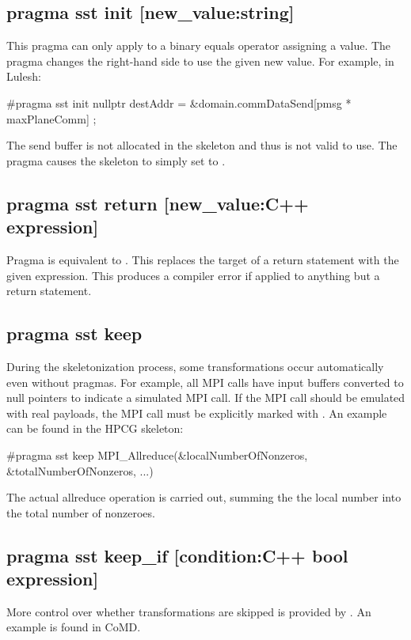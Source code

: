 \subsection{pragma sst init [new\_value:string]}
This pragma can only apply to a binary equals operator assigning a value.
The pragma changes the right-hand side to use the given new value.
For example, in Lulesh:

\begin{CppCode}
#pragma sst init nullptr
  destAddr = &domain.commDataSend[pmsg * maxPlaneComm] ;
\end{CppCode}
The send buffer  is not allocated in the skeleton and thus is not valid to use.
The pragma causes the skeleton to simply set  to .

\subsection{pragma sst return [new\_value:C++ expression]}
Pragma is equivalent to . This replaces the target of a return statement with the given expression.
This produces a compiler error if applied to anything but a return statement.

\subsection{pragma sst keep}
During the skeletonization process, some transformations occur automatically even without pragmas. 
For example, all MPI calls have input buffers converted to null pointers to indicate a simulated MPI call.
If the MPI call should be emulated with real payloads, the MPI call must be explicitly marked with .
An example can be found in the HPCG skeleton:

\begin{CppCode}
#pragma sst keep
  MPI_Allreduce(&localNumberOfNonzeros, &totalNumberOfNonzeros, ...)
\end{CppCode}
The actual allreduce operation is carried out, summing the the local number into the total number of nonzeroes.

\subsection{pragma sst keep\_if [condition:C++ bool expression]}
More control over whether transformations are skipped is provided by .
An example is found in CoMD.

